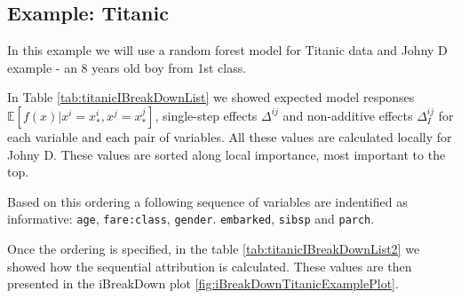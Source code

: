 \documentclass[12pt,]{krantz}
\theoremstyle{definition}
\theoremstyle{definition}
\theoremstyle{definition}
\theoremstyle{remark}
\begin{document}
\hypertarget{example-titanic}{%
\subsection{Example: Titanic}\label{example-titanic}}

In this example we will use a random forest model for Titanic data and
Johny D example - an 8 years old boy from 1st class.

In Table \ref{tab:titanicIBreakDownList} we showed expected model
responses \(\mathbb{E}[f(x)|x^i = x_*^i, x^j = x_*^j]\), single-step
effects \(\Delta^{ij}\) and non-additive effects \(\Delta_{I}^{ij}\) for
each variable and each pair of variables. All these values are
calculated locally for Johny D. These values are sorted along local
importance, most important to the top.

Based on this ordering a following sequence of variables are indentified
as informative: \texttt{age}, \texttt{fare:class}, \texttt{gender}.
\texttt{embarked}, \texttt{sibsp} and \texttt{parch}.

Once the ordering is specified, in the table
\ref{tab:titanicIBreakDownList2} we showed how the sequential
attribution is calculated. These values are then presented in the
iBreakDown plot \ref{fig:iBreakDownTitanicExamplePlot}.
\end{document}
